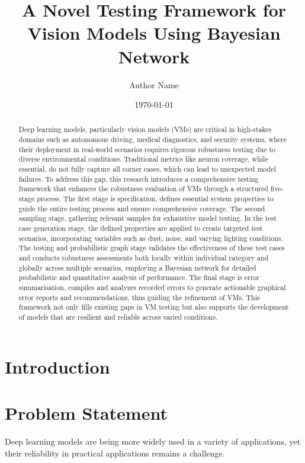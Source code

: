 \documentclass[10pt, conference, a4paper, final]{IEEEtran}
\title{ A Novel Testing Framework for Vision Models Using Bayesian Network}
\author{Author Name}
\date{\today}
\begin{document}
\maketitle

\begin{abstract}

    Deep learning models, particularly vision models (VMs) are critical in high-stakes domains such as autonomous driving, medical diagnostics, and security systems, where their deployment in real-world scenarios requires rigorous robustness testing due to diverse environmental conditions. Traditional metrics like neuron coverage, while essential, do not fully capture all corner cases, which can lead to unexpected model failures. To address this gap, this research introduces a comprehensive testing framework that enhances the robustness evaluation of VMs through a structured five-stage process. The first stage is specification, defines essential system properties to guide the entire testing process and ensure comprehensive coverage. The second sampling stage, gathering relevant samples for exhaustive model testing. In the test case generation stage, the defined properties are applied to create targeted test scenarios, incorporating variables such as dust, noise, and varying lighting conditions. The testing and probabilistic graph stage validates the effectiveness of these test cases and conducts robustness assessments both locally within individual category and globally across multiple scenarios, employing a Bayesian network for detailed probabilistic and quantitative analysis of performance. The final stage is error summarisation, compiles and analyzes recorded errors to generate actionable graphical error reports and recommendations, thus guiding the refinement of VMs. This framework not only fills existing gaps in VM testing but also supports the development of models that are resilient and reliable across varied conditions.
\end{abstract}


\section{Introduction}

\section{Problem Statement}

Deep learning models are being more widely used in a variety of applications, yet their reliability in practical applications remains a challenge.
\end{document}
